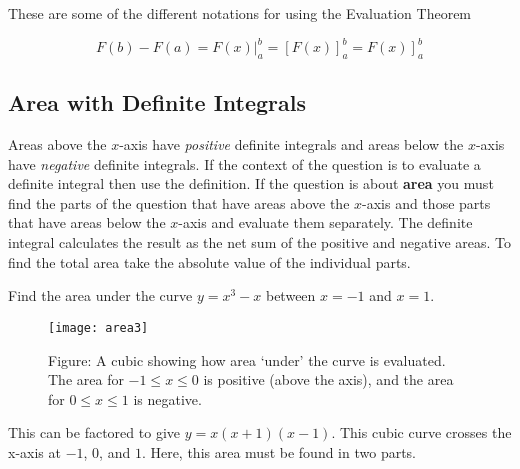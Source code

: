 These are some of the different notations for using the Evaluation Theorem 

\begin{equation*}F (b) -F (a) =F (x)\vert _{a}^{b} =\left [F (x)\right ]_{a}^{b} =\left .F (x)\right ]_{a}^{b}
\end{equation*}

\subsection*{Area with Definite Integrals}
Areas above the $x$-axis have \emph{positive} definite integrals and areas below the $x$-axis have \emph{negative} definite integrals. If the context of the question is to evaluate a definite integral then use the definition. If the question is about \textbf{area} you must find the parts of the question that have areas above the $x$-axis and those parts that have areas below the $x$-axis and evaluate them separately. The definite integral calculates the result as the net sum of the positive and negative areas. To find the total area take the absolute value of the individual parts.

\example Find the area under the curve $y =x^{3} -x$ between $x = -1$ and $x =1$.\medskip\\
\begin{SCfigure}[1][h]
	\texttt{[image: area3]}
	\caption*{Figure: A cubic showing how area `under' the curve is evaluated. The area for $-1\leq x\leq 0$ is positive (above the axis), and the area for $0\leq x\leq 1$ is negative.}
\end{SCfigure}

\solution This can be factored to give $y =x (x +1) (x -1)$. This cubic curve crosses the x-axis at $ -1$, $0$, and $1$. Here, this area must be found in two parts.

